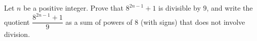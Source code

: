 Let $n$ be a positive integer. Prove that $8^{2n-1}+1$ is divisible by $9$, and write the quotient $\dfrac{8^{2n-1}+1}{9}$ as a sum of powers of $8$ (with signs) that does not involve division.
